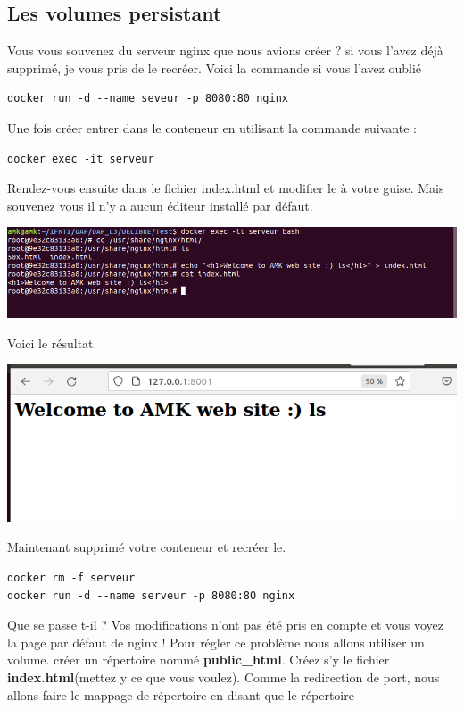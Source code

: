 \documentclass[12pt,a4paper]{article}
\begin{document}
\subsection{Les volumes persistant}
Vous vous souvenez du serveur nginx que nous avions créer ? si 
vous l'avez déjà supprimé, je vous pris de le recréer. Voici
la commande si vous l'avez oublié
\begin{verbatim}
docker run -d --name seveur -p 8080:80 nginx
\end{verbatim}
Une fois créer entrer dans le conteneur en utilisant la commande suivante :
\begin{verbatim}
docker exec -it serveur
\end{verbatim}
Rendez-vous ensuite dans le fichier index.html et modifier le à votre guise. Mais souvenez vous il n'y a aucun éditeur installé par défaut.
\begin{center}
\includegraphics[scale=0.5]{img/volume_persistant_1.png}
\end{center}
Voici le résultat.
\begin{center}
\includegraphics[scale=0.3]{img/volume_persistant.png}
\end{center}
Maintenant supprimé votre conteneur et recréer le.
\begin{verbatim}
docker rm -f serveur
docker run -d --name serveur -p 8080:80 nginx
\end{verbatim}
Que se passe t-il ?
Vos modifications n'ont pas été pris en compte et vous voyez la
page par défaut de nginx ! 
Pour régler ce problème nous allons utiliser un volume. créer un 
répertoire nommé \textbf{public\_html}. Créez s'y le fichier
\textbf{index.html}(mettez y ce que vous voulez).
Comme la redirection de port, nous allons 
faire le mappage de répertoire en disant que le répertoire 
\end{document}
